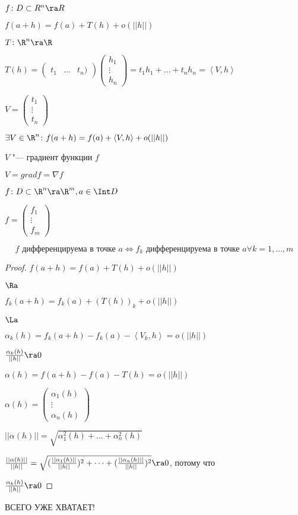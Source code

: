 $f \colon D \subset R^n \ra R$

$f(a + h) = f(a) + T(h) + o(||h||)$

$T \colon \R^n \ra \R$

$T(h) = 
\begin{pmatrix}
t_1 & \dots & t_n)
\end{pmatrix}
\begin{pmatrix}
h_1\\
\vdots \\
h_n
\end{pmatrix} = t_1h_1 + \dots + t_nh_n = \left< V, h \right>$

$V = 
\begin{pmatrix}
t_1\\
\vdots \\
t_n
\end{pmatrix}$

$\exists V \in \R^n \colon f(a + h) = f(a) + \left< V, h \right> + o(||h||)$

\begin{Def}
$V$ "--- градиент функции $f$

$V = grad f = \nabla f$
\end{Def}

\begin{theorem}
$f \colon D \subset \R^n \ra \R^m, a \in \Int D$

$f = 
\begin{pmatrix}
f_1\\
\vdots\\
f_m
\end{pmatrix}$

\[f \text{ дифференцируема в точке } a \Leftrightarrow f_k \text{ дифференцируема в точке } a \forall k = 1, \dots, m\]
\end{theorem} 

\begin{proof}
$f(a + h) = f(a) + T(h) + o(||h||)$

$\Ra$

$f_k(a + h) = f_k(a) + (T(h))_k + o(||h||)$

$\La$

$\alpha_k(h) = f_k(a+h) - f_k(a) - \left<V_k, h\right> = o(||h||)$

$\frac{\alpha_k(h)}{||h||} \ra 0$

$\alpha(h) = f(a+h) - f(a) - T(h) = o(||h||)$

$\alpha(h) = 
\begin{pmatrix}
\alpha_1(h)\\
\vdots\\
\alpha_n(h)
\end{pmatrix}$

$||\alpha(h)|| = \sqrt{\alpha_1^2(h) +\dots + \alpha_n^2(h)}$

$\frac{||\alpha(h)||}{||h||} = \sqrt{(\frac{||\alpha_1(h)||}{||h||}) ^ 2 + \dots + (\frac{||\alpha_n(h)||}{||h||}) ^ 2} \ra 0$, потому что

$\frac{\alpha_k(h)}{||h||} \ra 0$
\end{proof}
{\LARGE ВСЕГО УЖЕ ХВАТАЕТ!}

